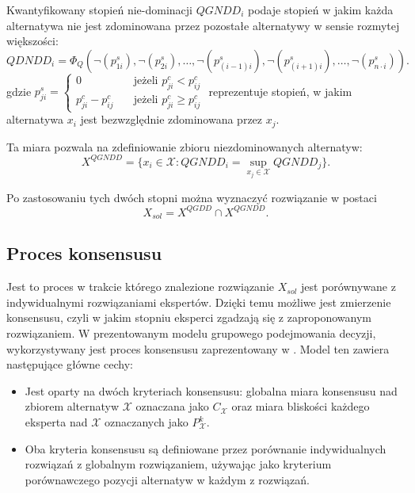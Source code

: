 Kwantyfikowany stopień nie-dominacji $QGNDD_i$ podaje stopień w jakim każda
alternatywa nie jest zdominowana przez pozostałe alternatywy w sensie rozmytej
większości:
\begin{equation}
QDNDD_i = \Phi_Q(\neg(p^s_{1i}), \neg(p^s_{2i}), \dotsc,
\neg(p^s_{(i-1)i}), \neg(p^s_{(i+1)i}), \dotsc, \neg(p^s_{n \cdot i})).
\end{equation}
gdzie
$p^s_{ji} = 
  \left\{ 
	\begin{array}{ll}
	  0 				  & \quad \textrm{jeżeli } p^c_{ji} < p^c_{ij} \\
      p^c_{ji} - p^c_{ij} & \quad \textrm{jeżeli } p^c_{ji} \geq p^c_{ij}
  	\end{array} 
  \right.
$
reprezentuje stopień, w jakim alternatywa $x_i$ jest bezwzględnie zdominowana
przez $x_j$.

Ta miara pozwala na zdefiniowanie zbioru niezdominowanych alternatyw:
\begin{equation}
X^{QGNDD} = \{ x_i \in \mathcal{X} : QGNDD_i = \sup_{x_j \in \mathcal{X}}
QGNDD_j
\}.
\end{equation}

Po zastosowaniu tych dwóch stopni można wyznaczyć rozwiązanie w postaci
\begin{equation}
X_{sol} = X^{QGDD} \cap X^{QGNDD}.
\end{equation}

\subsection{Proces konsensusu}
Jest to proces w trakcie którego znalezione rozwiązanie $X_{sol}$ jest
porównywane z indywidualnymi rozwiązaniami ekspertów. Dzięki temu możliwe jest
zmierzenie konsensusu, czyli w jakim stopniu eksperci zgadzają się z
zaproponowanym rozwiązaniem. W prezentowanym modelu grupowego podejmowania
decyzji, wykorzystywany jest proces konsensusu zaprezentowany w
\cite{Herrera1995}. Model ten zawiera następujące główne cechy:
\begin{itemize}
  \item Jest oparty na dwóch kryteriach konsensusu: globalna miara konsensusu
  nad zbiorem alternatyw $\mathcal{X}$ oznaczana jako $C_{\mathcal{X}}$ oraz
  miara bliskości każdego eksperta nad $\mathcal{X}$ oznaczanych jako
  $P^k_{\mathcal{X}}$.
  \item Oba kryteria konsensusu są definiowane przez porównanie indywidualnych
  rozwiązań z globalnym rozwiązaniem, używając jako kryterium porównawczego
  pozycji alternatyw w każdym z rozwiązań.
\end{itemize}

